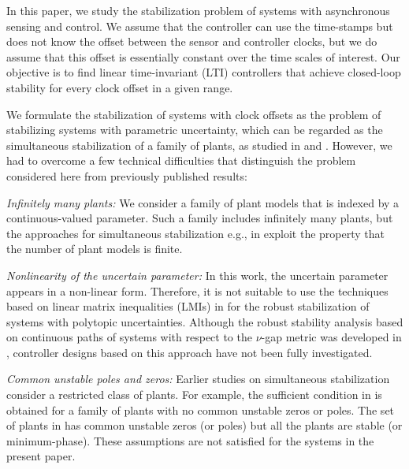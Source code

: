 \documentclass[letterpaper, 12pt, draftcls, onecolumn]{ieeeconf}
\begin{document}
In this paper, we study the stabilization problem of
systems with asynchronous sensing and control.
We assume that
the controller can use the time-stamps but does not know
the offset between
the sensor and controller clocks, but
we do assume that this offset is essentially constant over the time
scales of interest.
Our objective is to find linear time-invariant (LTI) controllers 
that achieve closed-loop stability
for every clock offset in a given range.





We formulate the stabilization of systems with clock offsets as the problem
of stabilizing systems with parametric uncertainty,
which can be regarded as the
simultaneous stabilization of a family of plants, as 
studied in \cite[Sec. 5.4]{vidyasagar1985} and
\cite{Vidyasagar1982}.
However, we had to overcome a few technical difficulties that distinguish the problem considered here from previously published results:

{\it Infinitely many plants:}
We consider a family of plant models that is indexed by 
a continuous-valued parameter.
Such a family
includes infinitely many plants, but
the approaches for simultaneous stabilization 
e.g., in \cite{Shi2009}
exploit the property that the number of plant models is finite.

{\it Nonlinearity of the uncertain parameter:}
In this work, 
the uncertain parameter appears in a non-linear form.
Therefore, it is not suitable to use the techniques 
based on linear matrix inequalities (LMIs) in 
\cite{Oliveira1999}
for the robust stabilization
of systems with polytopic uncertainties.
Although the robust stability analysis based on continuous paths of
systems with respect to the $\nu$-gap metric
was developed in \cite{Cantoni2012},
controller designs based on this approach have not been fully investigated.

{\it Common unstable poles and zeros:}
Earlier studies on simultaneous stabilization consider
a restricted class of plants.
For example, 
the sufficient condition 
in \cite{Blondel1993Suf}
is obtained for a family of plants with
no common unstable zeros or poles. 
The set of plants in \cite{Maeda1984} has
common unstable zeros (or poles) but
all the plants are stable (or minimum-phase).
These assumptions are not satisfied for the systems 
in the present paper.
\end{document}
